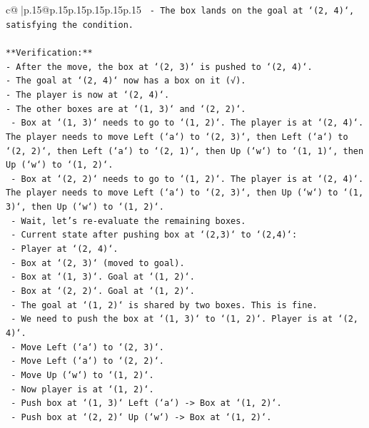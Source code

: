 \documentclass{article}
\begin{document}
{\begin{supertabular}{c@{$\;$}|p{.15\linewidth}@{}p{.15\linewidth}p{.15\linewidth}p{.15\linewidth}p{.15\linewidth}p{.15\linewidth}}
{{{\texttt{    {-} The box lands on the goal at `(2, 4)`, satisfying the condition.} \\
\\ 
\texttt{**Verification:**} \\
\texttt{{-} After the move, the box at `(2, 3)` is pushed to `(2, 4)`.} \\
\texttt{{-} The goal at `(2, 4)` now has a box on it (√).} \\
\texttt{{-} The player is now at `(2, 4)`.} \\
\texttt{{-} The other boxes are at `(1, 3)` and `(2, 2)`.} \\
\texttt{    {-} Box at `(1, 3)` needs to go to `(1, 2)`. The player is at `(2, 4)`. The player needs to move Left (`a`) to `(2, 3)`, then Left (`a`) to `(2, 2)`, then Left (`a`) to `(2, 1)`, then Up (`w`) to `(1, 1)`, then Up (`w`) to `(1, 2)`.} \\
\texttt{    {-} Box at `(2, 2)` needs to go to `(1, 2)`. The player is at `(2, 4)`. The player needs to move Left (`a`) to `(2, 3)`, then Up (`w`) to `(1, 3)`, then Up (`w`) to `(1, 2)`.} \\
\texttt{    {-} Wait, let's re{-}evaluate the remaining boxes.} \\
\texttt{    {-} Current state after pushing box at `(2,3)` to `(2,4)`:} \\
\texttt{        {-} Player at `(2, 4)`.} \\
\texttt{        {-} Box at `(2, 3)` (moved to goal).} \\
\texttt{        {-} Box at `(1, 3)`. Goal at `(1, 2)`.} \\
\texttt{        {-} Box at `(2, 2)`. Goal at `(1, 2)`.} \\
\texttt{    {-} The goal at `(1, 2)` is shared by two boxes. This is fine.} \\
\texttt{    {-} We need to push the box at `(1, 3)` to `(1, 2)`. Player is at `(2, 4)`.} \\
\texttt{        {-} Move Left (`a`) to `(2, 3)`.} \\
\texttt{        {-} Move Left (`a`) to `(2, 2)`.} \\
\texttt{        {-} Move Up (`w`) to `(1, 2)`.} \\
\texttt{        {-} Now player is at `(1, 2)`.} \\
\texttt{        {-} Push box at `(1, 3)` Left (`a`) {-}> Box at `(1, 2)`.} \\
\texttt{        {-} Push box at `(2, 2)` Up (`w`) {-}> Box at `(1, 2)`.} \\
}}}
\end{supertabular}}
\end{document}
